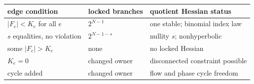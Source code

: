 \documentclass[10pt]{article}
\begin{document}
\begin{center}
\small
\begin{tabular}{lll}
\toprule
edge condition & locked branches & quotient Hessian status\\
\midrule
$|F_e|<K_e$ for all $e$ & $2^{N-1}$ & one stable; binomial index law\\
$s$ equalities, no violation & $2^{N-1-s}$ & nullity $s$; nonhyperbolic\\
some $|F_e|>K_e$ & none & no locked Hessian\\
$K_e=0$ & changed owner & disconnected constraint possible\\
cycle added & changed owner & flow and phase cycle freedom\\
\bottomrule
\end{tabular}
\end{center}
\end{document}
